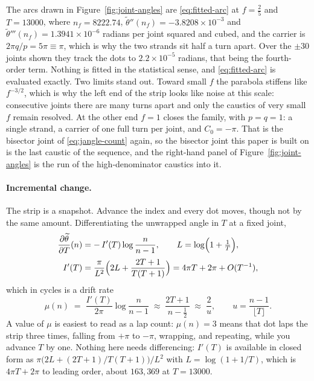 \documentclass[11pt]{article}
\theoremstyle{definition}
\begin{document}
The arcs drawn in Figure~\ref{fig:joint-angles} are \eqref{eq:fitted-arc} at
$f=\tfrac25$ and $T=13000$, where $n_f=8222.74$,
$\widetilde\theta''(n_f)=-3.8208\times10^{-3}$ and
$\widetilde\theta'''(n_f)=1.3941\times10^{-6}$ radians per joint squared and
cubed, and the carrier is $2\pi q/p=5\pi\equiv\pi$, which is why the two strands
sit half a turn apart. Over the $\pm30$ joints shown they track the dots to
$2.2\times10^{-5}$ radians, that being the fourth-order term. Nothing is fitted
in the statistical sense, and \eqref{eq:fitted-arc} is evaluated exactly.
Two limits stand out.
Toward small $f$ the parabola stiffens like $f^{-3/2}$, which is why the
left end of the strip looks like noise at this scale: consecutive joints there
are many turns apart and only the caustics of very small $f$ remain resolved. At
the other end $f=1$ closes the family, with $p=q=1$: a single strand, a carrier of
one full turn per joint, and $C_0=-\pi$. That is the bisector joint of
\eqref{eq:jangle-count} again, so the bisector joint this paper is built on is the last
caustic of the sequence, and the right-hand panel of
Figure~\ref{fig:joint-angles} is the run of the high-denominator caustics into
it.

\paragraph{Incremental change.}\label{sec:incremental}
The strip is a snapshot. Advance the index and every dot moves, though not by
the same amount. Differentiating the unwrapped angle in $T$ at a fixed joint,
\begin{equation}\label{eq:jangle-drift}
\begin{aligned}
\frac{\partial\widetilde\theta}{\partial T}(n)&=-\,I'(T)\log\frac{n}{n-1},
\qquad L=\log\Bigl(1+\tfrac1T\Bigr),\\[2pt]
I'(T)&=\frac{\pi}{L^{2}}\Bigl(2L+\frac{2T+1}{T(T+1)}\Bigr)
=4\pi T+2\pi+O(T^{-1}),
\end{aligned}
\end{equation}
which in cycles is a drift rate
\begin{equation}\label{eq:jangle-drift-cycles}
\mu(n)\;=\;\frac{I'(T)}{2\pi}\log\frac{n}{n-1}
\;\approx\;\frac{2T+1}{n-\tfrac12}\;\approx\;\frac{2}{u},
\qquad u=\frac{n-1}{\lfloor T\rfloor}.
\end{equation}
A value of $\mu$ is easiest to read as a lap count: $\mu(n)=3$ means that dot
laps the strip three times, falling from $+\pi$ to $-\pi$, wrapping, and
repeating, while you advance $T$ by one. Nothing here needs differencing:
$I'(T)$ is available in closed form as
$\pi\bigl(2L+(2T+1)/T(T+1)\bigr)/L^{2}$ with $L=\log(1+1/T)$, which is
$4\pi T+2\pi$ to leading order, about $163{,}369$ at $T=13000$.
\end{document}
